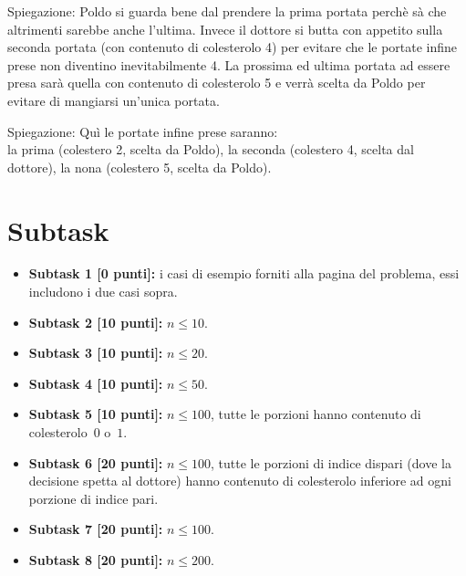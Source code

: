 \vspace{0.5cm}

Spiegazione: Poldo si guarda bene dal prendere la prima portata perchè sà che altrimenti sarebbe anche l'ultima. Invece il dottore si butta con appetito sulla seconda portata (con contenuto di colesterolo 4) per evitare che le portate infine prese non diventino inevitabilmente 4. La prossima ed ultima portata ad essere presa sarà quella con contenuto di colesterolo 5 e verrà scelta da Poldo per evitare di mangiarsi un'unica portata.

\vspace{0.5cm}

Spiegazione: Quì le portate infine prese saranno:\\
\indent la prima (colestero 2, scelta da Poldo),
\indent la seconda (colestero 4, scelta dal dottore),
\indent la nona (colestero 5, scelta da Poldo).

\section*{Subtask}

  \begin{itemize}
    \item \textbf{Subtask 1 [0 punti]:} i casi di esempio forniti alla pagina del problema, essi includono i due casi sopra.
    \item \textbf{Subtask 2 [10 punti]:} $n \le 10$.
    \item \textbf{Subtask 3 [10 punti]:} $n \le 20$.
    \item \textbf{Subtask 4 [10 punti]:} $n \le 50$.
    \item \textbf{Subtask 5 [10 punti]:} $n \le 100$, tutte le porzioni hanno contenuto di colesterolo~$0$ o~$1$.
    \item \textbf{Subtask 6 [20 punti]:} $n \le 100$, tutte le porzioni di indice dispari (dove la decisione spetta al dottore) hanno contenuto di colesterolo inferiore ad ogni porzione di indice pari.
    \item \textbf{Subtask 7 [20 punti]:} $n \le 100$.
    \item \textbf{Subtask 8 [20 punti]:} $n \le 200$.
  \end{itemize}
  
